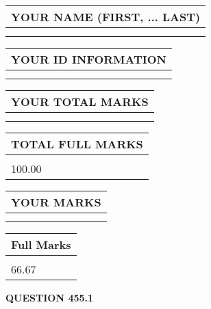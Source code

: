 \documentclass{ctexart}
\begin{document}
   
   
   
\newpage 
\setcounter{page}{ 
   455001 } 
   
   
   
   
\noindent\begin{tabular}{|l|}
\hline
YOUR NAME (FIRST, ... LAST)  \\
\hline
 \\ 
 \\ 
\hline
\end{tabular}
\hspace{0.05in} \begin{tabular}{|l|}
\hline
 YOUR   ID   INFORMATION  \\
\hline
 \\ 
 \\ 
\hline
\end{tabular}
   
   
\vspace{0.2in}\noindent\begin{tabular}{|l|}
\hline
YOUR TOTAL MARKS  \\
\hline
 \\ 
 \\ 
\hline
\end{tabular}
\hspace{0.05in} \begin{tabular}{|l|}
\hline
TOTAL FULL MARKS  \\
\hline
 \\ 
100.00 \\
\hline
\end{tabular}
   
   
 \vspace{0.2in}
 
 
 
 
   
   
  
\vspace{0.2in}
  
\noindent\begin{tabular}{|l|}
\hline
 YOUR MARKS  \\
\hline
 \\ 
 \\ 
\hline
\end{tabular}
\hspace{0.05in} \begin{tabular}{|l|}
\hline
 Full Marks  \\
\hline
 \\ 
66.67 \\
\hline
\end{tabular}
{\textbf{\Large{QUESTION
455.1 
}}}
  
\end{document}
